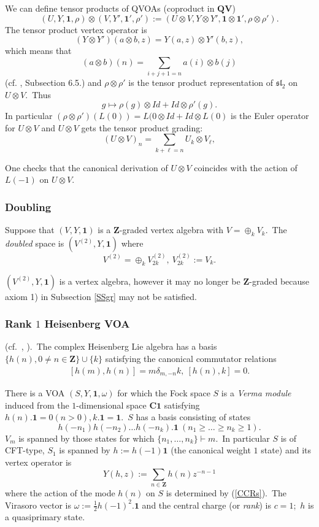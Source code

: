 \documentclass[12pt]{amsart}
\theoremstyle{plain}
\theoremstyle{definition}
\theoremstyle{remark}
\newcommand{\CC}{\mathbf{C}}
\newcommand{\ZZ}{\mathbf{Z}}
\begin{document}
\medskip
We can define tensor products of QVOAs (coproduct in $\mathbf{QV}$) 
$$(U, Y, \mathbf{1}, \rho)\otimes(V, Y', \mathbf{1}', \rho'):= (U\otimes V, Y\otimes Y', \mathbf{1}\otimes\mathbf{1}', \rho\otimes \rho').$$
The tensor product  vertex operator is
$$(Y\otimes Y')(a\otimes b, z)=Y(a, z)\otimes Y'(b, z),$$
which means that
$$(a\otimes b)(n)=\sum_{i+j+1=n} a(i)\otimes b(j)$$
(cf. \cite{Mason1}, Subsection 6.5.) and
$\rho\otimes \rho'$ is the tensor product representation of $\mathfrak{sl}_2$ on $U\otimes V$.\ Thus
$$g\mapsto \rho(g)\otimes Id+Id\otimes \rho'(g).$$ 
In particular $(\rho\otimes \rho')(L(0))=L(0\otimes Id+Id\otimes L(0)$ is the Euler operator for $U\otimes V$ and
$U\otimes V$ gets the tensor product grading:
$$(U\otimes V)_n= \sum_{k+\ell=n} U_k \otimes V_{\ell},$$

One checks that the canonical derivation of $U\otimes V$
coincides with the action of $L(-1)$ on $U\otimes V$.
\subsubsection{Doubling}\label{SSdouble} Suppose that 
$(V, Y, \mathbf{1})$ is a $\ZZ$-graded vertex algebra with $V=\oplus_k V_k$.\ The \textit{doubled} space is
$(V^{(2)}, Y, \mathbf{1})$ where
$$V^{(2)}= \oplus_k V^{(2)}_{2k},\ V_{2k}^{(2)}:=V_k.$$

$(V^{(2)}, Y, \mathbf{1})$ is a vertex algebra, however it may no longer be 
$\ZZ$-graded because axiom 1) in Subsection \ref{SSgr} may not be satisfied.
\subsubsection{Rank $1$ Heisenberg VOA}\label{AppS} (cf.\  \cite{Kac}, \cite{LepowskyLi}).\  The complex Heisenberg Lie algebra has a basis
$\{h(n), 0\neq n\in\ZZ\}\cup{\{k\}}$ satisfying the canonical commutator relations
\begin{eqnarray}\label{CCRs}
    [h(m), h(n)]= m\delta_{m, -n}k, \ [h(n), k]=0.
\end{eqnarray}

There is a VOA $(S, Y, \mathbf{1}, \omega)$ for which the Fock space $S$ is a \textit{Verma module} induced from the $1$-dimensional space $\CC\mathbf{1}$ satisfying $h(n).\mathbf{1}=0(n>0), k.\mathbf{1}=\mathbf{1}$.\ $S$ has a basis consisting of states
$$h(-n_1)h(-n_2)\hdots h(-n_k).\mathbf{1} \ (n_1\geq\hdots\geq n_k\geq1).$$
$V_m$ is spanned by those states for which
$\{n_1, \hdots, n_k\} \vdash m$.\ In particular
$S$ is of CFT-type, $S_1$ is spanned by $h:=h(-1)\mathbf{1}$ (the canonical weight $1$ state) and its vertex operator is
$$Y(h, z):= \sum_{n\in\ZZ} h(n)z^{-n-1}$$
where the action of the mode $h(n)$ on $S$ is determined by (\ref{CCRs}).\ The Virasoro vector is
$\omega:=\tfrac{1}{2}h(-1)^2.\mathbf{1}$  and the central charge (or \textit{rank}) is $c=1$;\ $h$ is a quasiprimary state.
\end{document}
